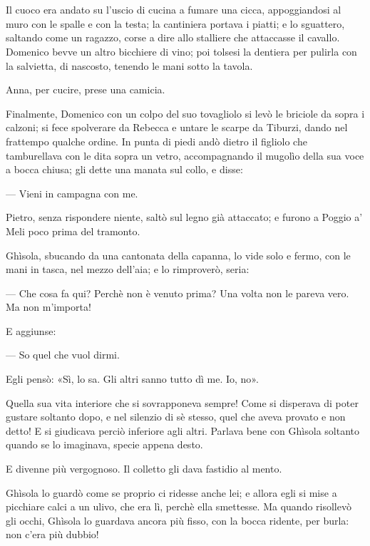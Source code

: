 \chapter{}

Il cuoco era andato su l'uscio di cucina a fumare una cicca, appoggiandosi al muro con le spalle e con la testa; la cantiniera portava i piatti; e lo sguattero, saltando come un ragazzo, corse a dire allo stalliere che attaccasse il cavallo. Domenico bevve un altro bicchiere di vino; poi tolsesi la dentiera per pulirla con la salvietta, di nascosto, tenendo le mani sotto la tavola.

Anna, per cucire, prese una camicia.

Finalmente, Domenico con un colpo del suo tovagliolo si levò le briciole da sopra i calzoni; si fece spolverare da Rebecca e untare le scarpe da Tiburzi, dando nel frattempo qualche ordine. In punta di piedi andò dietro il figliolo che tamburellava con le dita sopra un vetro, accompagnando il mugolìo della sua voce a bocca chiusa; gli dette una manata sul collo, e disse:

— Vieni in campagna con me.

Pietro, senza rispondere niente, saltò sul legno già attaccato; e furono a Poggio a' Meli poco prima del tramonto.

Ghìsola, sbucando da una cantonata della capanna, lo vide solo e fermo, con le mani in tasca, nel mezzo dell'aia; e lo rimproverò, seria:

— Che cosa fa qui? Perchè non è venuto prima? Una volta non le pareva vero. Ma non m'importa!

E aggiunse:

— So quel che vuol dirmi.

Egli pensò: «Sì, lo sa. Gli altri sanno tutto dì me. Io, no».

Quella sua vita interiore che si sovrapponeva sempre! Come si disperava di poter gustare soltanto dopo, e nel silenzio di sè stesso, quel che aveva provato e non detto! E si giudicava perciò inferiore agli altri. Parlava bene con Ghìsola soltanto quando se lo imaginava, specie appena desto.

E divenne più vergognoso. Il colletto gli dava fastidio al mento.

Ghìsola lo guardò come se proprio ci ridesse anche lei; e allora egli si mise a picchiare calci a un ulivo, che era lì, perchè ella smettesse. Ma quando risollevò gli occhi, Ghìsola lo guardava ancora più fisso, con la bocca ridente, per burla: non c'era più dubbio!

